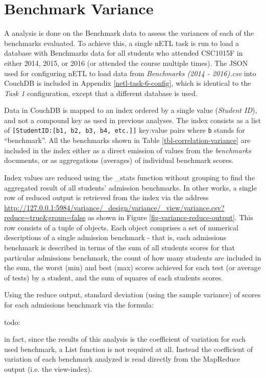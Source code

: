 \section{Benchmark Variance}
A  analysis is done on the Benchmark data to assess the variances of each of the benchmarks evaluated. To achieve this, a single nETL task is run to load a database with Benchmarks data for all students who attended CSC1015F in either 2014, 2015, or 2016 (or attended the course multiple times). The JSON used for configuring nETL to load data from \textit{Benchmarks (2014 - 2016).csv} into CouchDB is included in Appendix \ref{netl-task-6-config}, which is identical to the \textit{Task 1} configuration, except that a different database is used.

Data in CouchDB is mapped to an index ordered by a single value (\textit{Student ID}), and not a compound key as used in previous analyses. The index consists as a list of \texttt{[StudentID:[b1, b2, b3, b4, etc.]]} key:value pairs where \texttt{b} stands for ``benchmark''. All the benchmarks shown in Table \ref{tbl-correlation-variance} are included in the index either as a direct emission of values from the \textit{benchmarks} documents, or as aggregations (averages) of individual benchmark scores.

Index values are reduced using the \_stats function without grouping to find the aggregated result of all students' admission benchmarks. In other works, a single row of reduced output is retrieved from the index via the address \url{http://127.0.0.1:5984/variance/_design/variance/_view/variance.csv?reduce=true&group=false} as shown in Figure \ref{fig-variance-reduce-output}. This row consists of a tuple of objects. Each object comprises a set of numerical descriptions of a single admission benchmark - that is, each admissions benchmark is described in terms of the sum of all students scores for that particular admissions benchmark, the count of how many students are included in the sum, the worst (min) and best (max) scores achieved for each test (or average of tests) by a student, and the sum of squares of each students scores.

Using the reduce output, standard deviation (using the sample variance) of scores for each admissions benchmark via the formula:

todo:




in fact, since the results of this analysis is the coefficient of variation for each used benchmark, a List function is not required at all. Instead the coefficient of variation of each benchmark analyzed is read directly from the MapReduce output (i.e. the view-index).

